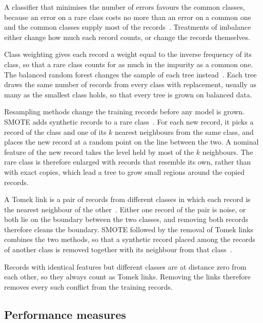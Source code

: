 \documentclass[conference,10pt]{IEEEtran}
\begin{document}
A classifier that minimises the number of errors favours the common classes,
because an error on a rare class costs no more than an error on a common one
and the common classes supply most of the records~\cite{he2009learning}.  Treatments of imbalance either change how much each record
counts, or change the records themselves.

Class weighting gives each record a weight equal to the inverse frequency of
its class, so that a rare class counts for as much in the impurity as a
common one. The balanced random forest changes the sample of each tree
instead~\cite{chen2004using}. Each tree draws the same number of records
from every class with replacement, usually as many as the smallest class
holds, so that every tree is grown on balanced data. 

Resampling methods change the training records before any model is grown.
SMOTE adds synthetic records to a rare class~\cite{chawla2002smote}. For
each new record, it picks a record of the class and one of its $k$ nearest
neighbours from the same class, and places the new record at a random point
on the line between the two. A nominal feature of the new record takes the
level held by most of the $k$ neighbours. The rare class is therefore
enlarged with records that resemble its own, rather than with exact copies,
which lead a tree to grow small regions around the copied records.

A Tomek link is a pair of records from different classes in which each record is the nearest neighbour of the other~\cite{tomek1976two}. Either one record of the pair
is noise, or both lie on the boundary between the two classes, and removing
both records therefore cleans the boundary. SMOTE followed by the removal of
Tomek links combines the two methods, so that a synthetic record placed among the records of another class is
removed together with its neighbour from that class~\cite{batista2004study}.

Records with identical features but different classes are at distance zero
from each other, so they always count as Tomek links. Removing the links
therefore removes every such conflict from the training records. 

\subsection{Performance measures}
\label{subsec:bg_measures}
\end{document}
